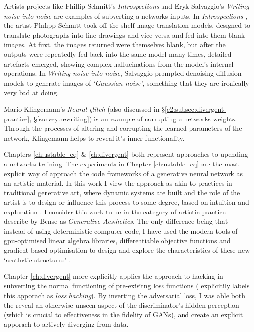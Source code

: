 Artists projects like Phillip Schmitt's \textit{Introspections} \citep{schmitt2019introspections} and Eryk Salvaggio's \textit{Writing noise into noise} \citep{salvaggio2023noise} are examples of subverting a networks inputs. 
In \textit{Introspections} \cite{schmitt2019introspections}, the artist Philipp Schmitt took off-the-shelf image translation models, designed to translate photographs into line drawings and vice-versa and fed into them blank images. At first, the images returned were themselves blank, but after the outputs were repeatedly fed back into the same model many times, detailed artefacts emerged, showing complex hallucinations from the model's internal operations.
In \textit{Writing noise into noise}, Salvaggio prompted denoising diffusion models \cite{sohl2015deep} to generate images of \textit{`Gaussian noise'}, something that they are ironically very bad at doing.

Mario Klingemann's \textit{Neural glitch} (also discussed in \S \ref{c2:subsec:divergent-practice}; \S \ref{survey:rewriting}) is an example of corrupting a networks weights. 
Through the processes of altering and corrupting the learned parameters of the network, Klingemann helps to reveal it's inner functionality.

Chapters \ref{ch:ustable_eq} \& \ref{ch:divergent} both represent approaches to upending a networks training. 
The experiments in Chapter \ref{ch:ustable_eq} are the most explicit way of approach the code frameworks of a generative neural network as an artistic material.
In this work I view the approach as akin to practices in traditional generative art, where dynamic systems are built and the role of the artist is to design or influence this process to some degree, based on intuition and exploration \cite{mccormack2004generative}.
I consider this work to be in the category of artistic practice describe by Bense as \textit{Generative Aesthetics}.
The only difference being that instead of using deterministic computer code, I have used the modern tools of gpu-optimised linear algebra libraries, differentiable objective functions and gradient-based optimisation to design and explore the characteristics of these new `aesthetic structures' \cite{bense1965projekte}.

Chapter \ref{ch:divergent} more explicitly applies the approach to hacking in subverting the normal functioning of pre-exisitng loss functions (\cite{berns2020bridging} explicitily labels this apporach as \textit{loss hacking}).
By inverting the adversarial loss, I was able both the reveal an otherwise unseen aspect of the discriminator's hidden perception (which is crucial to effectiveness in the fidelity of GANs), and create an explicit apporach to actively diverging from data.

